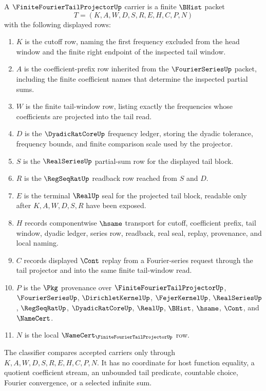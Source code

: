 \begin{definition}
\label{def:finite-fourier-tail-projector-carrier}
A $\FiniteFourierTailProjectorUp$ carrier is a finite $\BHist$ packet
$$
T=(K,A,W,D,S,R,E,H,C,P,N)
$$
with the following displayed rows:
\begin{enumerate}
\item $K$ is the cutoff row, naming the first frequency excluded from the head window and the finite right endpoint of the inspected tail window.
\item $A$ is the coefficient-prefix row inherited from the $\FourierSeriesUp$ packet, including the finite coefficient names that determine the inspected partial sums.
\item $W$ is the finite tail-window row, listing exactly the frequencies whose coefficients are projected into the tail read.
\item $D$ is the $\DyadicRatCoreUp$ frequency ledger, storing the dyadic tolerance, frequency bounds, and finite comparison scale used by the projector.
\item $S$ is the $\RealSeriesUp$ partial-sum row for the displayed tail block.
\item $R$ is the $\RegSeqRatUp$ readback row reached from $S$ and $D$.
\item $E$ is the terminal $\RealUp$ seal for the projected tail block, readable only after $K,A,W,D,S,R$ have been exposed.
\item $H$ records componentwise $\hsame$ transport for cutoff, coefficient prefix, tail window, dyadic ledger, series row, readback, real seal, replay, provenance, and local naming.
\item $C$ records displayed $\Cont$ replay from a Fourier-series request through the tail projector and into the same finite tail-window read.
\item $P$ is the $\Pkg$ provenance over $\FiniteFourierTailProjectorUp$, $\FourierSeriesUp$, $\DirichletKernelUp$, $\FejerKernelUp$, $\RealSeriesUp$, $\RegSeqRatUp$, $\DyadicRatCoreUp$, $\RealUp$, $\BHist$, $\hsame$, $\Cont$, and $\NameCert$.
\item $N$ is the local $\NameCert_{\FiniteFourierTailProjectorUp}$ row.
\end{enumerate}
The classifier compares accepted carriers only through $K,A,W,D,S,R,E,H,C,P,N$. It has no coordinate for host function equality, a quotient coefficient stream, an unbounded tail predicate, countable choice, Fourier convergence, or a selected infinite sum.
\end{definition}

